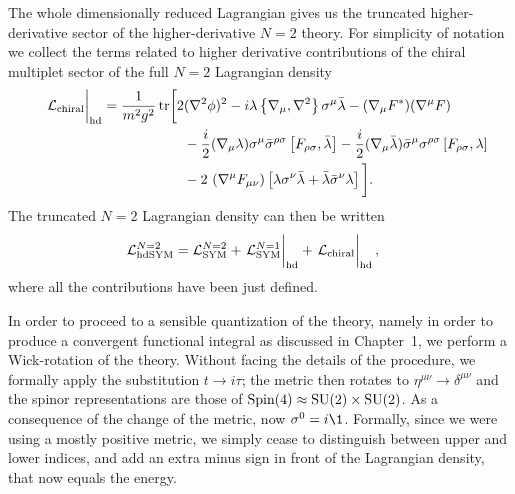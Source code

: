 The whole dimensionally reduced Lagrangian gives us the truncated higher-derivative sector of the higher-derivative $N=2$ \sym{} theory. For simplicity of notation we collect  the terms related to higher derivative contributions of the chiral multiplet sector of the full $N=2$  Lagrangian density
\begin{equation}\label{lagr-HDonly-chiral-4d}
\begin{split}
\left.\phantom{\int}{ \mathcal{L} }_{{ \text{chiral} }}\right|_{{ \text{hd} }}
	=
\frac{1}{m^2 g^2} \operatorname{tr} & \bigg[
		 2 ( { \mathcal{\nabla} }^2 \phi )^2
		- i \lambda \left\{ { \mathcal{\nabla} }_\mu, { \mathcal{\nabla} }^2 \right\}	\sigma^\mu \bar \lambda
		- ( { \mathcal{\nabla} }_\mu F^* ) ( { \mathcal{\nabla} }^\mu F )  		
	\\
	& \quad
		- \frac{i}{2} 
			({ \mathcal{\nabla} }_\mu \lambda) \sigma^\mu \bar \sigma^{\rho \sigma}
			\left[ F_{ \rho \sigma } , 	 \bar \lambda \right]
		- \frac{i}{2}
			({ \mathcal{\nabla} }_\mu \bar \lambda) \bar \sigma^\mu \sigma^{\rho \sigma}
			\left[ F_{ \rho \sigma } ,  \lambda \right]	
	\\
	& \quad
		- 2\ ( { \mathcal{\nabla} }^\mu F_{ \mu \nu } )
			\left[
				\lambda \sigma^\nu \bar \lambda 
				+ \bar \lambda \bar \sigma^\nu \lambda 				
				\right]
\bigg].
\end{split}
\end{equation}
The truncated $N=2$ Lagrangian density can then be written
\begin{equation}\label{lagr-N=2-HDsym-4d}
\begin{split}
{ \mathcal{L} }^{ N = 2 }_{ { \text{hd} } { \text{SYM} } }
	& =
{ \mathcal{L} }^{N=2}_{ \text{SYM} } 
+ \left.\phantom{\int}\hspace{-1em}{ \mathcal{L} }^{ N = 1 }_{{ \text{SYM} }}\right|_{{ \text{hd} }}
+ \left.\phantom{\int}\hspace{-1em}{ \mathcal{L} }_{ { \text{chiral} } }\right|_{{ \text{hd} }},
\end{split}
\end{equation}
where all the contributions have been just defined.



In order to proceed to a sensible quantization of the theory, namely in order to produce a convergent functional integral as discussed in Chapter~1, we perform a Wick-rotation of the theory. Without facing the details of the procedure, we formally apply the substitution $t \rightarrow i \tau $; the metric then rotates to $\eta^{\mu\nu} \rightarrow \delta^{\mu\nu}$ and the spinor representations are those of ${ \text{Spin} }(4) \approx { \text{SU} }(2) \times { \text{SU} }(2) $. As a consequence of the change of the metric, now $\sigma^0 = i \1$. Formally, since we were using a mostly positive metric, we simply cease to distinguish between upper and lower indices, and add an extra minus sign in front of the Lagrangian density, that now equals the energy.




